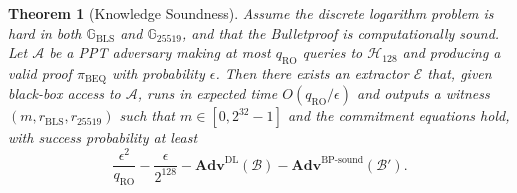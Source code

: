 \documentclass[11pt]{article}
\theoremstyle{definitionstyle}
\newtheorem{theorem}{Theorem}[section]
\theoremstyle{plain}
\newcommand{\advantage}[1]{\mathbf{Adv}^{\mathrm{#1}}}
\begin{document}
\begin{theorem}[Knowledge Soundness]
\label{thm:beq-knowledge}
Assume the discrete logarithm problem is hard in both $\mathbb{G}_{\text{BLS}}$ and $\mathbb{G}_{25519}$, and that the Bulletproof is computationally sound. Let $\mathcal{A}$ be a PPT adversary making at most $q_{\text{RO}}$ queries to $\mathcal{H}_{128}$ and producing a valid proof $\pi_{\text{BEQ}}$ with probability $\epsilon$. Then there exists an extractor $\mathcal{E}$ that, given black-box access to $\mathcal{A}$, runs in expected time $O(q_{\text{RO}}/\epsilon)$ and outputs a witness $(m, r_{\text{BLS}}, r_{25519})$ such that $m \in [0,2^{32}-1]$ and the commitment equations hold, with success probability at least
\[
\frac{\epsilon^2}{q_{\text{RO}}} - \frac{\epsilon}{2^{128}} - \advantage{DL}(\mathcal{B}) - \advantage{BP\text{-}sound}(\mathcal{B}').
\]
\end{theorem}
\end{document}

